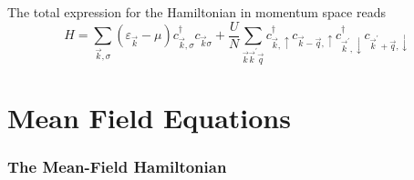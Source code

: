 \documentclass[a4paper,10pt]{report}
\begin{document}
The total expression for the Hamiltonian in momentum space reads
 \begin{equation}
  \hat{H} = \sum_{\vec{k},\sigma} \left(\varepsilon_{\vec k} - \mu\right) c^{\dagger}_{\vec{k},\sigma}c_{\vec{k}\sigma} + \frac{U}{N} \sum_{\vec{k}\vec{k}^{\prime}\vec{q}}
	c^{\dagger}_{\vec{k},\uparrow}c_{\vec{k}-\vec{q},\uparrow} c^{\dagger}_{\vec{k}^{\prime},\downarrow}c_{\vec{k}^{\prime}+\vec{q},\downarrow}
 \end{equation} 

\section{Mean Field Equations}

\subsubsection{The Mean-Field Hamiltonian}
\end{document}
